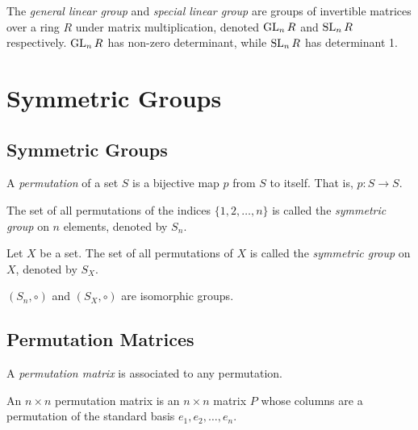 \documentclass{article}
\begin{document}
\begin{example}
  The \emph{general linear group} and \emph{special linear group} are groups of invertible matrices over a ring $R$ under matrix multiplication, denoted $\operatorname{GL}_n R$ and $\operatorname{SL}_n R$ respectively.
  $\operatorname{GL}_n R$ has non-zero determinant, while $\operatorname{SL}_n R$ has determinant 1.
\end{example}

\section{Symmetric Groups}

\subsection{Symmetric Groups}

\begin{definition}[Permutation]
  A \emph{permutation} of a set $S$ is a bijective map $p$ from $S$ to itself. That is, $p \colon S \to S$.
\end{definition}

\begin{definition}
  The set of all permutations of the indices $\{1, 2, \ldots, n\}$ is called the \emph{symmetric group} on $n$ elements, denoted by $S_n$.
\end{definition}

\begin{definition}
  Let $X$ be a set. The set of all permutations of $X$ is called the \emph{symmetric group} on $X$, denoted by $S_X$.
\end{definition}

\begin{proposition}
  $(S_n, \circ)$ and $(S_X, \circ)$ are isomorphic groups.
\end{proposition}

\subsection{Permutation Matrices}

A \emph{permutation matrix} is associated to any permutation.

\begin{definition}
  An $n \times n$ permutation matrix is an $n \times n$ matrix $P$ whose columns are a permutation of the standard basis $e_1, e_2, \ldots, e_n$.
\end{definition}
\end{document}
